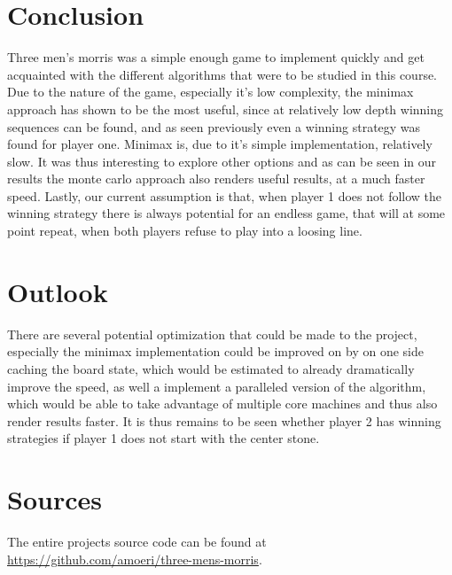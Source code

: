 \section{Conclusion}
Three men's morris was a simple enough game to implement quickly and get acquainted with the different algorithms that were to be studied in this course.
Due to the nature of the game, especially it's low complexity, the minimax approach has shown to be the most useful, since at relatively low depth winning sequences can be found, and as seen previously even a winning strategy was found for player one.
Minimax is, due to it's simple implementation, relatively slow. It was thus interesting to explore other options and as can be seen in our results the monte carlo approach also renders useful results, at a much faster speed.
Lastly, our current assumption is that, when player 1 does not follow the winning strategy there is always potential for an endless game, that will at some point repeat, when both players refuse to play into a loosing line.

\section{Outlook}
There are several potential optimization that could be made to the project, especially the minimax implementation could be improved on by on one side caching the board state, which would be estimated to already dramatically improve the speed, as well a implement a paralleled version of the algorithm, which would be able to take advantage of multiple core machines and thus also render results faster.
It is thus remains to be seen whether player 2 has winning strategies if player 1 does not start with the center stone.

\section{Sources}

The entire projects source code can be found at \url{https://github.com/amoeri/three-mens-morris}.